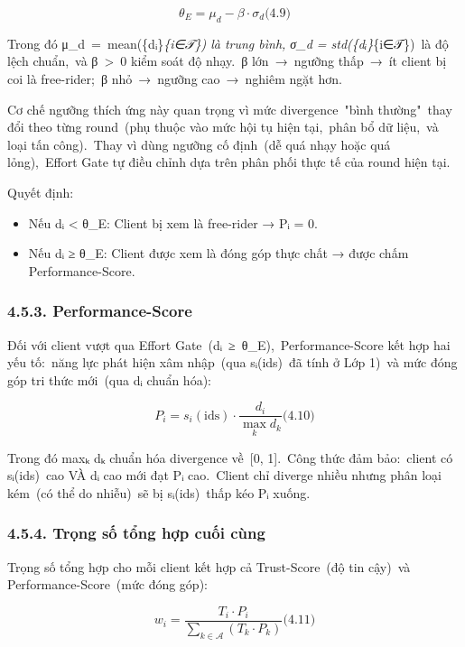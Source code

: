 \[\theta_{E} = \mu_{d} - \beta \cdot \sigma_{d}\text{(4.9)}
\]

Trong đó μ\_d~=~mean(\{dᵢ\}\emph{\{i∈𝒯\}) là trung bình, σ\_d = std(\{dᵢ\}}\{i∈𝒯\})~là độ lệch chuẩn,~và β~\textgreater~0 kiểm soát độ nhạy.~β lớn~→~ngưỡng thấp~→~ít client bị coi là free-rider;~β nhỏ~→~ngưỡng cao~→~nghiêm ngặt hơn.

Cơ chế ngưỡng thích ứng này quan trọng vì mức divergence~"bình thường"~thay đổi theo từng round~(phụ thuộc vào mức hội tụ hiện tại,~phân bổ dữ liệu,~và loại tấn công).~Thay vì dùng ngưỡng cố định~(dễ quá nhạy hoặc quá lỏng),~Effort Gate tự điều chỉnh dựa trên phân phối thực tế của round hiện tại.

Quyết định:

\begin{itemize}
\item
  Nếu dᵢ \textless{} θ\_E: Client bị xem là free-rider → Pᵢ = 0.
\item
  Nếu dᵢ ≥ θ\_E: Client được xem là đóng góp thực chất → được chấm Performance-Score.
\end{itemize}

\subsubsection{4.5.3. Performance-Score}\label{performance-score}

Đối với client vượt qua Effort Gate~(dᵢ~≥~θ\_E),~Performance-Score kết hợp hai yếu tố:~năng lực phát hiện xâm nhập~(qua sᵢ(ids)~đã tính ở Lớp 1)~và mức đóng góp tri thức mới~(qua dᵢ chuẩn hóa):

\[P_{i} = s_{i}(\text{ids}) \cdot \frac{d_{i}}{\max_{k}d_{k}}\text{(4.10)}
\]

Trong đó maxₖ dₖ chuẩn hóa divergence về~{[}0, 1{]}.~Công thức đảm bảo:~client có sᵢ(ids)~cao VÀ dᵢ cao mới đạt Pᵢ cao.~Client chỉ diverge nhiều nhưng phân loại kém~(có thể do nhiễu)~sẽ bị sᵢ(ids)~thấp kéo Pᵢ xuống.

\subsubsection{4.5.4. Trọng số tổng hợp cuối cùng}\label{trux1ecdng-sux1ed1-tux1ed5ng-hux1ee3p-cuux1ed1i-cuxf9ng}

Trọng số tổng hợp cho mỗi client kết hợp cả Trust-Score~(độ tin cậy)~và Performance-Score~(mức đóng góp):

\[w_{i} = \frac{T_{i} \cdot P_{i}}{\sum_{k \in \mathcal{A}}^{}(T_{k} \cdot P_{k})}\text{(4.11)}
\]

